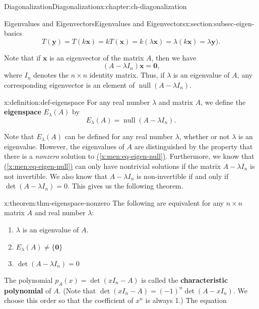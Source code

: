 \documentclass[oneside,10pt,]{book}
\newcommand{\xreffont}{\relax}
\newcommand{\terminology}[1]{\textbf{#1}}
\numberwithin{equation}{section}
\newcommand{\nll}{\operatorname{null}}
\newcommand{\xx}{\mathbf{x}}
\newcommand{\yy}{\mathbf{y}}
\begin{document}
\begin{chapterptx}{Diagonalization}{}{Diagonalization}{}{}{x:chapter:ch-diagonalization}
\begin{sectionptx}{Eigenvalues and Eigenvectors}{}{Eigenvalues and Eigenvectors}{}{}{x:section:subsec-eigen-basics}
\begin{equation*}
T(\yy)=T(k\xx)=kT(\xx)=k(\lambda \xx)=\lambda(k\xx)=\lambda\yy)\text{.}
\end{equation*}
%
\par
Note that if \(\xx\) is an eigenvector of the matrix \(A\), then we have%
\begin{equation}
(A-\lambda I_n)\xx=\mathbf{0}\text{,}\label{x:men:eq-eigen-null}
\end{equation}
where \(I_n\) denotes the \(n\times n\) identity matrix. Thus, if \(\lambda\) is an eigenvalue of \(A\), any corresponding eigenvector is an element of \(\nll(A-\lambda I_n)\).%
\begin{definition}{}{x:definition:def-eigenspace}%
For any real number \(\lambda\) and matrix \(A\), we define the \terminology{eigenspace} \(E_\lambda(A)\) by%
\begin{equation*}
E_\lambda(A) = \nll (A-\lambda I_n)\text{.}
\end{equation*}
%
\end{definition}
Note that \(E_\lambda(A)\) can be defined for any real number \(\lambda\), whether or not \(\lambda\) is an eigenvalue. However, the eigenvalues of \(A\) are distinguished by the property that there is a \emph{nonzero} solution to \hyperref[x:men:eq-eigen-null]{({\xreffont\ref{x:men:eq-eigen-null}})}. Furthermore, we know that \hyperref[x:men:eq-eigen-null]{({\xreffont\ref{x:men:eq-eigen-null}})} can only have nontrivial solutions if the matrix \(A-\lambda I_n\) is not invertible. We also know that \(A-\lambda I_n\) is non-invertible if and only if \(\det (A-\lambda I_n) = 0\). This gives us the following theorem.%
\begin{theorem}{}{}{x:theorem:thm-eigenspace-nonzero}%
The following are equivalent for any \(n\times n\) matrix \(A\) and real number \(\lambda\):%
\begin{enumerate}
\item{}\(\lambda\) is an eigenvalue of \(A\).%
\item{}\(\displaystyle E_\lambda(A)\neq \{\mathbf{0}\}\)%
\item{}\(\displaystyle \det(A-\lambda I_n) = 0\)%
\end{enumerate}
%
\end{theorem}
The polynomial \(p_A(x)=\det(xI_n -A)\) is called the \terminology{characteristic polynomial} of \(A\). (Note that \(\det(x I_n-A) = (-1)^n\det(A-x I_n)\). We choose this order so that the coefficient of \(x^n\) is always 1.) The equation%
\begin{equation}

\end{equation}
\end{sectionptx}
\end{chapterptx}
\end{document}
